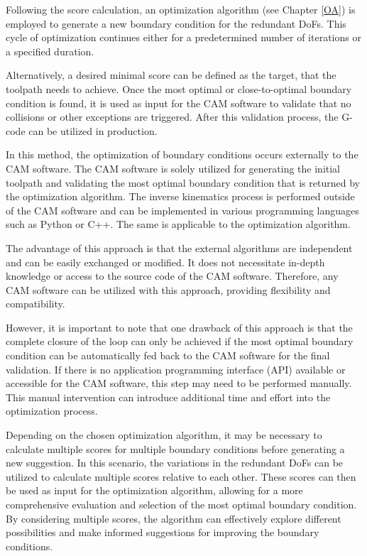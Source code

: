 \documentclass[conference]{IEEEtran}
\begin{document}
Following the score calculation, an optimization algorithm (see Chapter \ref{OA}) is employed to generate a new boundary condition for the redundant DoFs. This cycle of optimization continues either for a predetermined number of iterations or a specified duration. 

Alternatively, a desired minimal score can be defined as the target, that the toolpath needs to achieve. Once the most optimal or close-to-optimal boundary condition is found, it is used as input for the CAM software to validate that no collisions or other exceptions are triggered. After this validation process, the G-code can be utilized in production.


In this method, the optimization of boundary conditions occurs externally to the CAM software. The CAM software is solely utilized for generating the initial toolpath and validating the most optimal boundary condition that is returned by the optimization algorithm. The inverse kinematics process is performed outside of the CAM software and can be implemented in various programming languages such as Python or C++. The same is applicable to the optimization algorithm.

The advantage of this approach is that the external algorithms are independent and can be easily exchanged or modified. It does not necessitate in-depth knowledge or access to the source code of the CAM software. Therefore, any CAM software can be utilized with this approach, providing flexibility and compatibility.    

However, it is important to note that one drawback of this approach is that the complete closure of the loop can only be achieved if the most optimal boundary condition can be automatically fed back to the CAM software for the final validation. If there is no application programming interface (API) available or accessible for the CAM software, this step may need to be performed manually. This manual intervention can introduce additional time and effort into the optimization process.

Depending on the chosen optimization algorithm, it may be necessary to calculate multiple scores for multiple boundary conditions before generating a new suggestion. In this scenario, the variations in the redundant DoFs can be utilized to calculate multiple scores relative to each other. These scores can then be used as input for the optimization algorithm, allowing for a more comprehensive evaluation and selection of the most optimal boundary condition. By considering multiple scores, the algorithm can effectively explore different possibilities and make informed suggestions for improving the boundary conditions.
\end{document}
